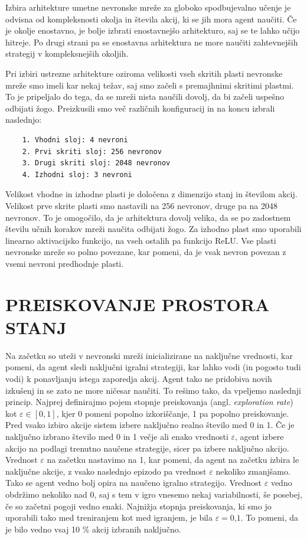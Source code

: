 \documentclass[cover]{thesis}
\begin{document}
Izbira arhitekture umetne nevronske mreže za globoko spodbujevalno učenje je odvisna od kompleksnosti okolja in števila akcij, ki se jih mora agent naučiti. Če je okolje enostavno, je bolje izbrati enostavnejšo arhitekturo, saj se te lahko učijo hitreje. Po drugi strani pa se enostavna arhitektura ne more naučiti zahtevnejših strategij v kompleksnejših okoljih.

Pri izbiri ustrezne arhitekture oziroma velikosti vseh skritih plasti nevronske mreže smo imeli kar nekaj težav, saj smo začeli s premajhnimi skritimi plastmi. To je pripeljalo do tega, da se mreži nista naučili dovolj, da bi začeli uspešno odbijati žogo. Preizkusili smo več različnih konfiguracij in na koncu izbrali naslednjo:
\begin{verbatim}        
    1. Vhodni sloj: 4 nevroni
    2. Prvi skriti sloj: 256 nevronov
    3. Drugi skriti sloj: 2048 nevronov
    4. Izhodni sloj: 3 nevroni
\end{verbatim}
Velikost vhodne in izhodne plasti je določena z dimenzijo stanj in številom akcij. Velikost prve skrite plasti smo nastavili na 256 nevronov, druge pa na 2048 nevronov. To je omogočilo, da je arhitektura dovolj velika, da se po zadostnem številu učnih korakov mreži naučita odbijati žogo. Za izhodno plast smo uporabili linearno aktivacijsko funkcijo, na vseh ostalih pa funkcijo ReLU. Vse plasti nevronske mreže so polno povezane, kar pomeni, da je vsak nevron povezan z vsemi nevroni predhodnje plasti.

\section{PREISKOVANJE PROSTORA STANJ}

Na začetku so uteži v nevronski mreži inicializirane na naključne vrednosti, kar pomeni, da agent sledi naključni igralni strategiji, kar lahko vodi (in pogosto tudi vodi) k ponavljanju istega zaporedja akcij. Agent tako ne pridobiva novih izkušenj in se zato ne more ničesar naučiti. To rešimo tako, da vpeljemo naslednji princip. Najprej definirajmo pojem stopnje preiskovanja (angl. \emph{exploration rate}) kot $\varepsilon \in [0,1]$, kjer 0 pomeni popolno izkoriščanje, 1 pa popolno preiskovanje. Pred vsako izbiro akcije sistem izbere naključno realno število med 0 in 1. Če je naključno izbrano število med 0 in 1 večje ali enako vrednosti $\varepsilon$, agent izbere akcijo na podlagi trenutno naučene strategije, sicer pa izbere naključno akcijo. Vrednost $\varepsilon$ na začetku nastavimo na 1, kar pomeni, da agent na začetku izbira le naključne akcije, z vsako naslednjo epizodo pa vrednost $\varepsilon$ nekoliko zmanjšamo. Tako se agent vedno bolj opira na naučeno igralno strategijo. Vrednost $\varepsilon$ vedno obdržimo nekoliko nad 0, saj s tem v igro vnesemo nekaj variabilnosti, še posebej, če so začetni pogoji vedno enaki. Najnižja stopnja preiskovanja, ki smo jo uporabili tako med treniranjem kot med igranjem, je bila $\varepsilon = 0\text{,}1$. To pomeni, da je bilo vedno vsaj 10 \% akcij izbranih naključno.
\end{document}
